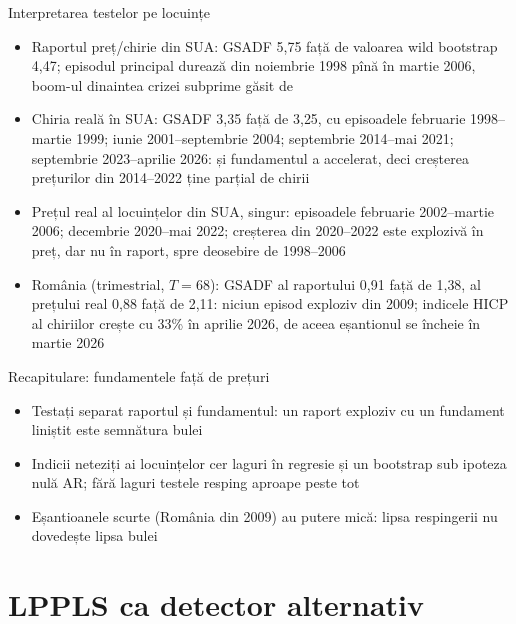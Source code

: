 \begin{frame}{Interpretarea testelor pe locuințe}
\itemsize{\footnotesize}
\begin{itemize}
    \item Raportul preț/chirie din SUA: GSADF 5{,}75 față de valoarea wild bootstrap 4{,}47; episodul principal durează din noiembrie 1998 pînă în martie 2006, boom-ul dinaintea crizei subprime găsit de 
    \item Chiria reală în SUA: GSADF 3{,}35 față de 3{,}25, cu episoadele februarie 1998--martie 1999; iunie 2001--septembrie 2004; septembrie 2014--mai 2021; septembrie 2023--aprilie 2026: și fundamentul a accelerat, deci creșterea prețurilor din 2014--2022 ține parțial de chirii
    \item Prețul real al locuințelor din SUA, singur: episoadele februarie 2002--martie 2006; decembrie 2020--mai 2022; creșterea din 2020--2022 este explozivă în preț, dar nu în raport, spre deosebire de 1998--2006
    \item România (trimestrial, $T = 68$): GSADF al raportului 0{,}91 față de 1{,}38, al prețului real 0{,}88 față de 2{,}11: niciun episod exploziv din 2009; indicele HICP al chiriilor crește cu 33\% în aprilie 2026, de aceea eșantionul se încheie în martie 2026
\end{itemize}
\end{frame}

\begin{frame}{Recapitulare: fundamentele față de prețuri}
\itemsize{\small}
\begin{itemize}
    \item Testați separat raportul și fundamentul: un raport exploziv cu un fundament liniștit este semnătura bulei
    \item Indicii neteziți ai locuințelor cer laguri în regresie și un bootstrap sub ipoteza nulă AR; fără laguri testele resping aproape peste tot
    \item Eșantioanele scurte (România din 2009) au putere mică: lipsa respingerii nu dovedește lipsa bulei
\end{itemize}
\end{frame}


\section{LPPLS ca detector alternativ}

